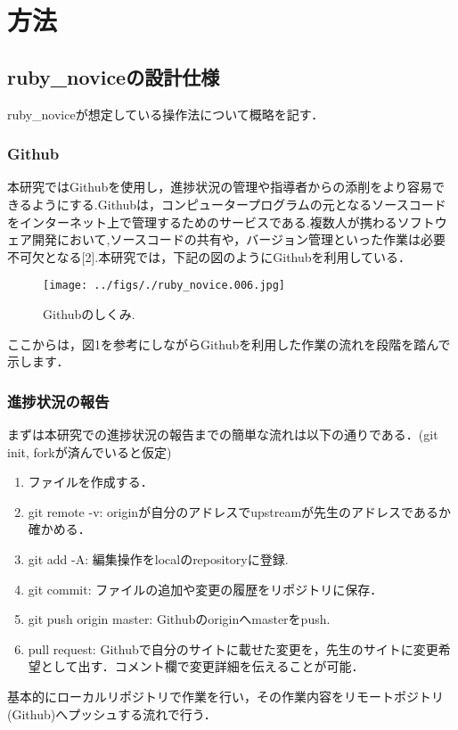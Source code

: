 \section{方法}
\subsection{ruby\_noviceの設計仕様}
ruby\_noviceが想定している操作法について概略を記す．

\subsubsection{Github}
本研究ではGithubを使用し，進捗状況の管理や指導者からの添削をより容易できるようにする.Githubは，コンピュータープログラムの元となるソースコードをインターネット上で管理するためのサービスである.複数人が携わるソフトウェア開発において,ソースコードの共有や，バージョン管理といった作業は必要不可欠となる[2].本研究では，下記の図のようにGithubを利用している．

\begin{figure}[htbp]\begin{center}
\texttt{[image: ../figs/./ruby\_novice.006.jpg]}
\caption{Githubのしくみ.}
\label{default}\end{center}\end{figure}
ここからは，図1を参考にしながらGithubを利用した作業の流れを段階を踏んで示します．

\subsubsection{進捗状況の報告}
まずは本研究での進捗状況の報告までの簡単な流れは以下の通りである．(git init, forkが済んでいると仮定)

\begin{enumerate}
\item ファイルを作成する．
\item git remote -v: originが自分のアドレスでupstreamが先生のアドレスであるか確かめる．
\item git add -A: 編集操作をlocalのrepositoryに登録.
\item git commit: ファイルの追加や変更の履歴をリポジトリに保存．
\item git push origin master: Githubのoriginへmasterをpush.
\item pull request: Githubで自分のサイトに載せた変更を，先生のサイトに変更希望として出す．コメント欄で変更詳細を伝えることが可能．
\end{enumerate}
基本的にローカルリポジトリで作業を行い，その作業内容をリモートポジトリ(Github)へプッシュする流れで行う．

